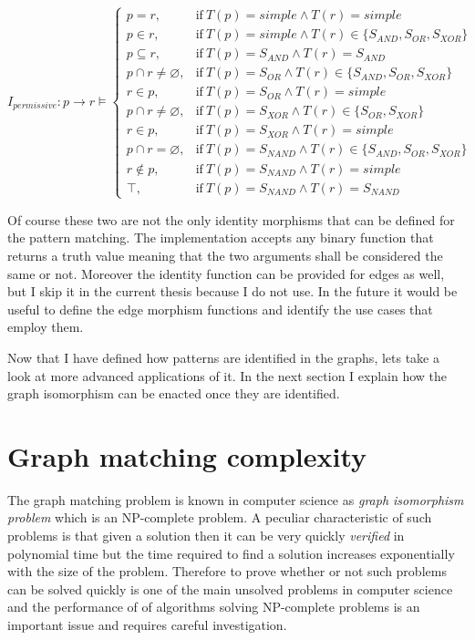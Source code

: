 \begin{equation} \label{eq:permissive}
	I_{permissive}:p \rightarrow r \models
	\begin{cases}
	p = r, & \text{if}\ T(p) = simple \wedge T(r) = simple \\
	p \in r, & \text{if}\ T(p) = simple \wedge T(r) \in \{S_{AND}, S_{OR}, S_{XOR}\} \\
	p \subseteq r, & \text{if}\ T(p) = S_{AND} \wedge T(r) = S_{AND} \\
	p \cap r \neq \varnothing, & \text{if}\ T(p) = S_{OR} \wedge T(r) \in \{S_{AND}, S_{OR}, S_{XOR}\}\\
	r \in p, & \text{if}\ T(p) = S_{OR} \wedge T(r) = simple \\
	p \cap r \neq \varnothing, & \text{if}\ T(p) = S_{XOR} \wedge T(r) \in \{S_{OR}, S_{XOR}\} \\
	r \in p, & \text{if}\ T(p) = S_{XOR} \wedge T(r) = simple \\
	p \cap r = \varnothing, & \text{if}\ T(p) = S_{NAND} \wedge T(r) \in \{S_{AND}, S_{OR}, S_{XOR}\} \\
	r \notin p, & \text{if}\ T(p) = S_{NAND} \wedge T(r) = simple \\
	\top, & \text{if}\ T(p) = S_{NAND} \wedge T(r) = S_{NAND}
	\end{cases}
\end{equation}

Of course these two are not the only identity morphisms that can be defined for the pattern matching. The implementation accepts any binary function that returns a truth value meaning that the two arguments shall be considered the same or not. Moreover the identity function can be provided for edges as well, but I skip it in the current thesis because I do not use. In the future it would be useful to define the edge morphism functions and identify the use cases that employ them.

Now that I have defined how patterns are identified in the graphs, lets take a look at more advanced applications of it. In the next section I explain how the graph isomorphism can be enacted once they are identified. 

\section{Graph matching complexity}
The graph matching problem is known in computer science as \textit{graph isomorphism problem} which is an NP-complete problem. 
A peculiar characteristic of such problems is that given a solution then it can be very quickly \textit{verified} in polynomial time but the time required to find a solution increases exponentially with the size of the problem. Therefore to prove whether or not such problems can be solved quickly is one of the main unsolved problems in computer science and the performance of of algorithms solving NP-complete problems is an important issue and requires careful investigation. 

